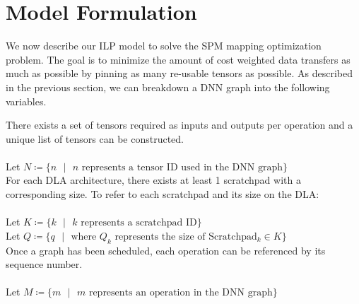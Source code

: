 \section{Model Formulation}

We now describe our ILP model to solve the SPM mapping optimization problem. The goal is to minimize
the amount of cost weighted data transfers as much as possible by pinning as many re-usable tensors
as possible. As described in the previous section, we can breakdown a DNN graph into the following variables.


There exists a set of tensors required as inputs and outputs per operation and a unique list of tensors can be constructed.\\
\\
Let $N \coloneqq \{ n \text{ }  | \text{ } n   \text{ represents a tensor ID used in the DNN graph}\}$\\

For each DLA architecture, there exists at least 1 scratchpad with a corresponding size. To refer to each scratchpad and its size on the DLA:\\
\\
Let $K \coloneqq \{ k \text{ }  | \text{ } k   \text{ represents a scratchpad ID}\}$\\
Let $Q \coloneqq \{ q \text{ }| \text{ } \text{where } Q_k \text{ represents the size of Scratchpad$_k \in K$}\}$\\

Once a graph has been scheduled, each operation can be referenced by its sequence number.\\
\\
Let $M \coloneqq \{ m \text{ }  | \text{ } m   \text{ represents an operation in the DNN graph}\}$\\

